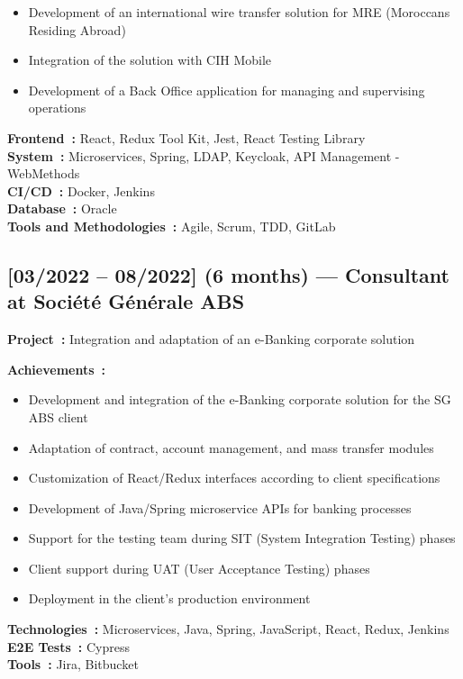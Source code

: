 \begin{itemize}
    \item Development of an international wire transfer solution for MRE (Moroccans Residing Abroad)
    \item Integration of the solution with CIH Mobile
    \item Development of a Back Office application for managing and supervising operations
\end{itemize}

\textbf{Frontend~:} React, Redux Tool Kit, Jest, React Testing Library\\
\textbf{System~:} Microservices, Spring, LDAP, Keycloak, API Management - WebMethods\\
\textbf{CI/CD~:} Docker, Jenkins\\
\textbf{Database~:} Oracle\\
\textbf{Tools and Methodologies~:} Agile, Scrum, TDD, GitLab

\subsection*{[03/2022 -- 08/2022] (6 months) --- Consultant at Société Générale ABS}
\vspace{4pt}
\textbf{Project~:} Integration and adaptation of an e-Banking corporate solution

\textbf{Achievements~:}
\begin{itemize}
    \item Development and integration of the e-Banking corporate solution for the SG ABS client
    \item Adaptation of contract, account management, and mass transfer modules
    \item Customization of React/Redux interfaces according to client specifications
    \item Development of Java/Spring microservice APIs for banking processes
    \item Support for the testing team during SIT (System Integration Testing) phases
    \item Client support during UAT (User Acceptance Testing) phases
    \item Deployment in the client's production environment
\end{itemize}
\textbf{Technologies~:} Microservices, Java, Spring, JavaScript, React, Redux, Jenkins\\
\textbf{E2E Tests~:} Cypress\\
\textbf{Tools~:} Jira, Bitbucket


